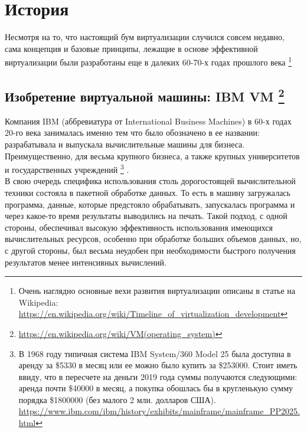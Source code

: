 \documentclass[14pt, a4paper]{article}
\begin{document}
\newpage
\tableofcontents
\newpage


\section*{История}


Несмотря на то, что настоящий бум виртуализации случился совсем недавно, сама
концепция и базовые принципы, лежащие в основе эффективной виртуализации были
разработаны еще в далеких 60-70-х годах прошлого века \footnote{Очень наглядно 
основные вехи развития виртуализации описаны в статье на Wikipedia: 
\href{https://en.wikipedia.org/wiki/Timeline_of_virtualization_development}{https://en.wikipedia.org/wiki/Timeline\_of\_virtualization\_development}}


\subsection*{Изобретение виртуальной машины: IBM VM \footnote{\href{https://en.wikipedia.org/wiki/VM_(operating_system)}{https://en.wikipedia.org/wiki/VM(operating\_system)}}}



Компания IBM (аббревиатура от International Business Machines) в 60-х годах 20-го века
занималась именно тем что было обозначено в ее названии: разрабатывала и
выпускала вычислительные машины для бизнеса. Преимущественно, для весьма
крупного бизнеса, а также крупных университетов и государственных учреждений 
\footnote{В 1968 году типичная система IBM System/360 Model 25 была доступна 
в аренду за \$5330 в месяц или ее можно было купить за \$253000. Стоит иметь ввиду, что 
в пересчете на деньги 2019 года суммы получаются следующими: аренда почти 
\$40000 в месяц, а покупка обошлась бы в кругленькую сумму порядка \$1800000 
(без малого 2 млн. долларов США). 
\href{https://www.ibm.com/ibm/history/exhibits/mainframe/mainframe_PP2025.html}{https://www.ibm.com/ibm/history/exhibits/mainframe/mainframe\_PP2025.html}} .\\


В свою очередь специфика использования столь дорогостоящей вычислительной
техники состояла в пакетной обработке данных. То есть в машину загружалась
программа, данные, которые предстояло обрабатывать, запускалась программа и
через какое-то время результаты выводились на печать. Такой подход, с одной
стороны, обеспечивал высокую эффективность использования имеющихся
вычислительных ресурсов, особенно при обработке больших объемов данных, но, с
другой стороны, был весьма неудобен при необходимости быстрого получения
результатов менее интенсивных вычислений.\\
\end{document}

